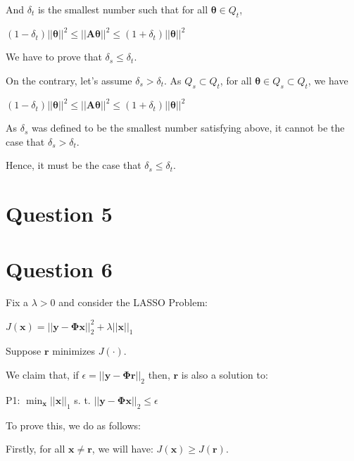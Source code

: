 \documentclass[fleqn, 11pt]{article}
\newcommand{\bs}[1]{\boldsymbol{#1}}
\begin{document}
And $\delta_t$ is the smallest number such that for all $ \bs{\theta} \in Q_t$, 
\begin{center}
    $ (1-\delta_t) || \bs{\theta} ||^2 \leq || \bs{A\theta} ||^2 
    \leq (1+\delta_t) || \bs{\theta} ||^2 $
\end{center}

We have to prove that $\delta_s \leq \delta_t$. 

On the contrary, let's assume $\delta_s > \delta_t$. 
As $Q_s \subset Q_t$, for all $ \bs{\theta} \in Q_s \subset Q_t$, we have 

\begin{center}
    $ (1-\delta_t) || \bs{\theta} ||^2 \leq || \bs{A\theta} ||^2 
    \leq (1+\delta_t) || \bs{\theta} ||^2 $
\end{center}

As $\delta_s$ was defined to be the smallest number satisfying above, 
it cannot be the case that $\delta_s > \delta_t$.


Hence, it must be the case that $\delta_s \leq \delta_t$.

\newpage
\section*{Question 5}
\setcounter{equation}{0}


\newpage
\section*{Question 6}
\setcounter{equation}{0}

Fix a $\lambda > 0$ and consider the LASSO Problem:

$J(\boldsymbol{x}) = || \bs{y}-\bs{\Phi} \bs{x} ||_2^2 + \lambda ||\bs{x}||_1 $

\smallskip

Suppose $\bs{r}$ minimizes $J(\cdot)$. 

\smallskip

We claim that, if $\epsilon = || \bs{y}-\bs{\Phi} \bs{r} ||_2$ 
then, $\bs{r}$ is also a solution to: 

P1: $\min_{\bs{x}} ||\bs{x}||_1$ s. t. $|| \bs{y}-\bs{\Phi} \bs{x} ||_2  \leq \epsilon $

\smallskip

To prove this, we do as follows:

Firstly, for all $\bs{x} \neq \bs{r}$, we will have:  
$J(\bs{x}) \geq J(\bs{r})$.
\end{document}
